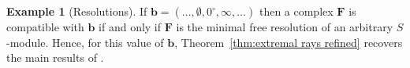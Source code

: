 \documentclass[12pt]{amsart}
\theoremstyle{definition}
\newtheorem{example}[lemma]{Example}
\theoremstyle{remark}
\newcommand{\bb}{\mathbf{b}}
\newcommand{\FF}{\mathbf{F}}
\newcommand{\zp}{\circ}
\begin{document}
\begin{example}[Resolutions]\label{ex:resolutions}
%
If $\bb=(\dots, \emptyset, 0^\zp, \infty, \dots)$ then a complex $\FF$ is compatible with $\bb$ if and only if $\FF$ is the minimal free resolution of an arbitrary $S$-module.  Hence, for this value of $\bb$, Theorem~\ref{thm:extremal rays refined} recovers the main results of \cite{boij-sod2}.
\end{example}
%
%
\end{document}
